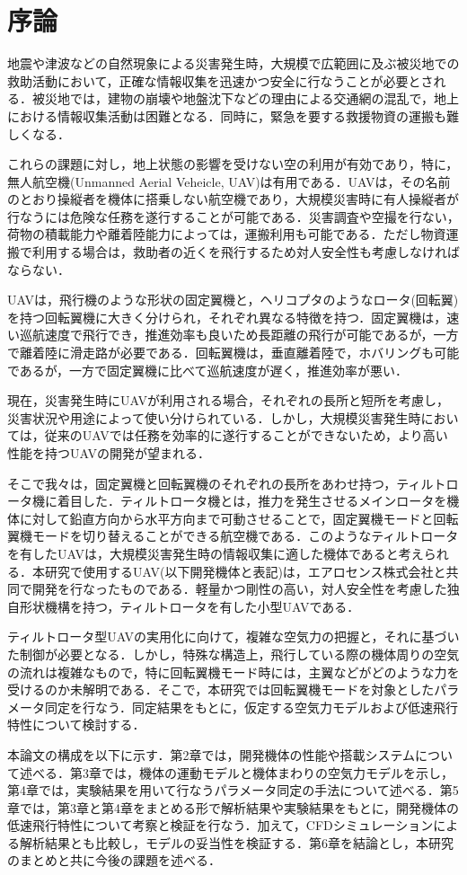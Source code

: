 
\chapter{序論}
\label{intro}

地震や津波などの自然現象による災害発生時，大規模で広範囲に及ぶ被災地での救助活動において，正確な情報収集を迅速かつ安全に行なうことが必要とされる．被災地では，建物の崩壊や地盤沈下などの理由による交通網の混乱で，地上における情報収集活動は困難となる．同時に，緊急を要する救援物資の運搬も難しくなる．

これらの課題に対し，地上状態の影響を受けない空の利用が有効であり，特に，無人航空機(Unmanned Aerial Veheicle, UAV)は有用である．UAVは，その名前のとおり操縦者を機体に搭乗しない航空機であり，大規模災害時に有人操縦者が行なうには危険な任務を遂行することが可能である．災害調査や空撮を行ない，荷物の積載能力や離着陸能力によっては，運搬利用も可能である．ただし物資運搬で利用する場合は，救助者の近くを飛行するため対人安全性も考慮しなければならない．

UAVは，飛行機のような形状の固定翼機と，ヘリコプタのようなロータ(回転翼)を持つ回転翼機に大きく分けられ，それぞれ異なる特徴を持つ．固定翼機は，速い巡航速度で飛行でき，推進効率も良いため長距離の飛行が可能であるが，一方で離着陸に滑走路が必要である．回転翼機は，垂直離着陸で，ホバリングも可能であるが，一方で固定翼機に比べて巡航速度が遅く，推進効率が悪い．

現在，災害発生時にUAVが利用される場合，それぞれの長所と短所を考慮し，災害状況や用途によって使い分けられている．しかし，大規模災害発生時においては，従来のUAVでは任務を効率的に遂行することができないため，より高い性能を持つUAVの開発が望まれる．

そこで我々は，固定翼機と回転翼機のそれぞれの長所をあわせ持つ，ティルトロータ機に着目した．ティルトロータ機とは，推力を発生させるメインロータを機体に対して鉛直方向から水平方向まで可動させることで，固定翼機モードと回転翼機モードを切り替えることができる航空機である．このようなティルトロータを有したUAVは，大規模災害発生時の情報収集に適した機体であると考えられる．本研究で使用するUAV(以下開発機体と表記)は，エアロセンス株式会社と共同で開発を行なったものである．軽量かつ剛性の高い，対人安全性を考慮した独自形状機構を持つ，ティルトロータを有した小型UAVである．

ティルトロータ型UAVの実用化に向けて，複雑な空気力の把握と，それに基づいた制御が必要となる．しかし，特殊な構造上，飛行している際の機体周りの空気の流れは複雑なもので，特に回転翼機モード時には，主翼などがどのような力を受けるのか未解明である．そこで，本研究では回転翼機モードを対象としたパラメータ同定を行なう．同定結果をもとに，仮定する空気力モデルおよび低速飛行特性について検討する．

本論文の構成を以下に示す．第2章では，開発機体の性能や搭載システムについて述べる．第3章では，機体の運動モデルと機体まわりの空気力モデルを示し，第4章では，実験結果を用いて行なうパラメータ同定の手法について述べる．第5章では，第3章と第4章をまとめる形で解析結果や実験結果をもとに，開発機体の低速飛行特性について考察と検証を行なう．加えて，CFDシミュレーションによる解析結果とも比較し，モデルの妥当性を検証する．第6章を結論とし，本研究のまとめと共に今後の課題を述べる．

